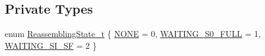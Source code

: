 \subsection*{Private Types}
\begin{DoxyCompactItemize}
\item 
enum \hyperlink{classns3_1_1LteRlcAm_a43eeebdccf778e2247c956481ed03d62}{Reassembling\+State\+\_\+t} \{ \hyperlink{classns3_1_1LteRlcAm_a43eeebdccf778e2247c956481ed03d62abca444d125df4d945065fb68b215a6d3}{N\+O\+NE} = 0, 
\hyperlink{classns3_1_1LteRlcAm_a43eeebdccf778e2247c956481ed03d62a832e01ad620b816d8bc1fe1b3fea8708}{W\+A\+I\+T\+I\+N\+G\+\_\+\+S0\+\_\+\+F\+U\+LL} = 1, 
\hyperlink{classns3_1_1LteRlcAm_a43eeebdccf778e2247c956481ed03d62a967f9c81a213f824b6a908bdfc1a7e4e}{W\+A\+I\+T\+I\+N\+G\+\_\+\+S\+I\+\_\+\+SF} = 2
 \}
\end{DoxyCompactItemize}
